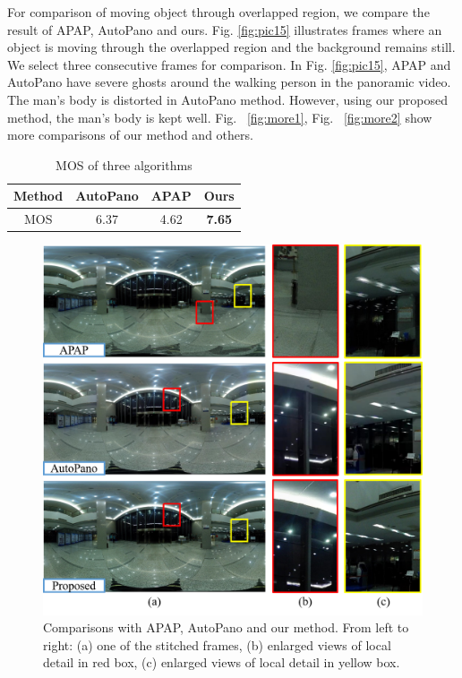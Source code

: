 \documentclass[conference]{IEEEtran}
\begin{document}
For comparison of moving object through overlapped region, we compare the result of APAP, AutoPano and ours. Fig. \ref{fig:pic15} 
illustrates frames where an object is moving through the overlapped region and the background remains still. 
We select three consecutive frames for comparison. In Fig. \ref{fig:pic15}, APAP and AutoPano have severe ghosts around the walking person in the panoramic video. 
The man's body is distorted in AutoPano method. However, using our proposed method, the man's body is kept well. 
Fig. ~\ref{fig:more1}, Fig. ~\ref{fig:more2} show more comparisons of our method and others.
\begin{table}[!htpb]
\caption{MOS of three algorithms}
\label{tab1:table1}
\centering
\begin{tabular}{c|c|c|c}
\hline
Method& AutoPano& APAP& Ours\\
\hline
MOS& 6.37& 4.62& \bf{7.65}\\
\hline
\end{tabular}
\end{table}
\begin{figure}[!htpb]
\centering
\includegraphics[scale=0.415]{picture35.png}
\caption{Comparisons with APAP, AutoPano and our method. From left to right: (a) one of the stitched frames, (b) enlarged views of local
detail in red box, (c) enlarged views of local detail in yellow box.}
\label{fig:pic17}
\end{figure}
\end{document}
